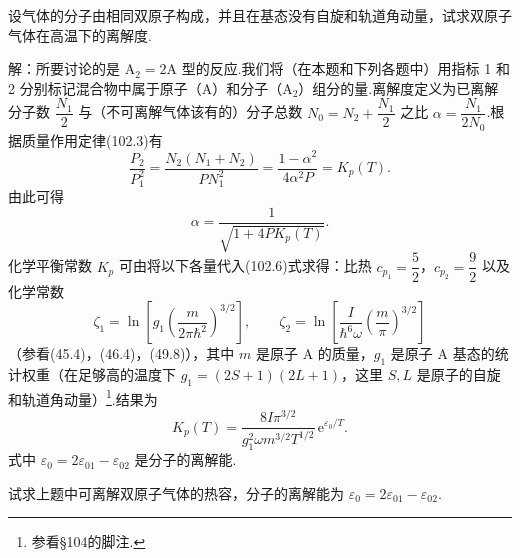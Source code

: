 \begin{xiti}

\quad 设气体的分子由相同双原子构成，并且在基态没有自旋和轨道角动量，试求双原子气体在高温下的离解度.

解：所要讨论的是 $\mathrm{A}_2=2\mathrm{A}$ 型的反应.我们将（在本题和下列各题中）用指标 1 和 2 分别标记混合物中属于原子（$\mathrm{A}$）和分子（$\mathrm{A}_2$）组分的量.离解度定义为已离解分子数 $\dfrac{N_1}{2}$ 与（不可离解气体该有的）分子总数 $N_0=N_2+\dfrac{N_1}{2}$ 之比 $\alpha=\dfrac{N_1}{2N_0}$.根据质量作用定律(102.3)有
\begin{equation*}
  \frac{P_2}{P_1^2}=\frac{N_2(N_1+N_2)}{PN_1^2}
  =\frac{1-\alpha^2}{4\alpha^2P}=K_p(T).\tag{1}
\end{equation*}
由此可得
\begin{equation*}
  \alpha=\frac{1}{\sqrt{1+4PK_p(T)}}.
\end{equation*}
化学平衡常数 $K_p$ 可由将以下各量代入(102.6)式求得：比热 $c_{p_1}=\dfrac52$，$c_{p_2}=\dfrac92$ 以及化学常数
\begin{equation*}
  \zeta_1=\ln\left[g_1\left(\frac{m}{2\pi\hbar^2}\right)^{3/2}\right],
  \qquad
  \zeta_2=\ln\left[\frac{I}{\hbar^6\omega}
  \left(\frac{m}{\pi}\right)^{3/2}\right]
\end{equation*}
（参看(45.4)，(46.4)，(49.8)），其中 $m$ 是原子 $\mathrm{A}$ 的质量，$g_1$ 是原子 $\mathrm{A}$ 基态的统计权重（在足够高的温度下 $g_1=(2S+1)(2L+1)$，这里 $S,L$ 是原子的自旋和轨道角动量）\footnote{参看§104的脚注.}.结果为
\begin{equation*}
  K_p(T)=\frac{8I\pi^{3/2}}{g_1^2\omega m^{3/2}T^{1/2}}\,
  \mathrm{e}^{\varepsilon_0/T}.\tag{2}
\end{equation*}
式中 $\varepsilon_0=2\varepsilon_{01}-\varepsilon_{02}$ 是分子的离解能.

\quad 试求上题中可离解双原子气体的热容，分子的离解能为 $\varepsilon_0=2\varepsilon_{01}-\varepsilon_{02}$.


\end{xiti}
